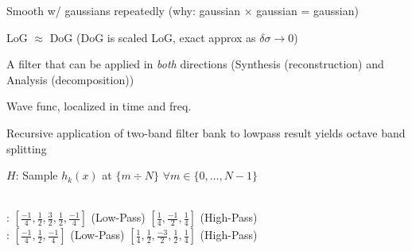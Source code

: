  Smooth w/ gaussians repeatedly (why: gaussian $\times$ gaussian = gaussian)


\shorttheorem LoG $\approx$ DoG (DoG is scaled LoG, exact approx as $\delta \sigma \rightarrow 0$)

 A filter that can be applied in \textit{both} directions (Synthesis (reconstruction) and Analysis (decomposition))

\shortdefinition[Wavelet] Wave func, localized in time and freq.

\shortremark[1D] Recursive application of two-band filter bank to lowpass result yields octave band splitting

\shortdefinition[Haar TF] $H$: Sample $h_k(x)$ at $\{ m \div N \}$ $\forall m \in \{ 0, \ldots, N - 1 \}$


\\
:
$\left[ \frac{-1}{4}, \frac{1}{2}, \frac{3}{2}, \frac{1}{2}, \frac{-1}{4} \right]$ (Low-Pass)
$\left[ \frac{1}{4}, \frac{-1}{2}, \frac{1}{4} \right]$ (High-Pass)\\
:
$\left[ \frac{-1}{4}, \frac{1}{2}, \frac{-1}{4} \right]$ (Low-Pass)
$\left[ \frac{1}{4}, \frac{1}{2}, \frac{-3}{2}, \frac{1}{2}, \frac{1}{4} \right]$ (High-Pass)

